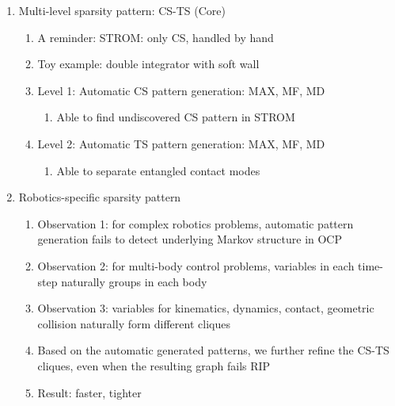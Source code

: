 \begin{enumerate}
    \item Multi-level sparsity pattern: CS-TS (Core)
    \begin{enumerate}
        \item A reminder: STROM: only CS, handled by hand
        \item Toy example: double integrator with soft wall
        \item Level 1: Automatic CS pattern generation: MAX, MF, MD
        \begin{enumerate}
            \item Able to find undiscovered CS pattern in STROM
        \end{enumerate}
        \item Level 2: Automatic TS pattern generation: MAX, MF, MD 
        \begin{enumerate}
            \item Able to separate entangled contact modes 
        \end{enumerate}
    \end{enumerate}

    \item Robotics-specific sparsity pattern 
    \begin{enumerate}
        \item Observation 1: for complex robotics problems, automatic pattern generation fails to detect underlying Markov structure in OCP 
        \item Observation 2: for multi-body control problems, variables in each time-step naturally groups in each body 
        \item Observation 3: variables for kinematics, dynamics, contact, geometric collision naturally form different cliques 
        \item Based on the automatic generated patterns, we further refine the CS-TS cliques, even when the resulting graph fails RIP
        \item Result: faster, tighter 
    \end{enumerate}


\end{enumerate}
